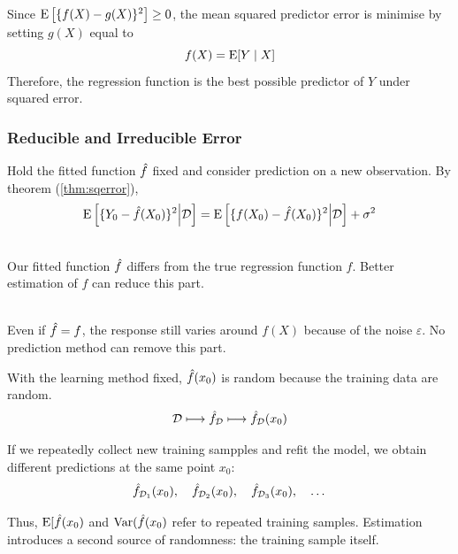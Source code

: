 Since $\operatorname{E} \big[\{f(X)-g(X)\}^2\big] \geq 0$, the mean squared predictor error is minimise by setting $g(X)$ equal to
\begin{equation*}
    f(X)=\operatorname{E}[Y \mid X]
\end{equation*}
Therefore, the regression function is the best possible predictor of $Y$ under squared error.

\subsubsection{Reducible and Irreducible Error}
Hold the fitted function $\hat{f}$ fixed and consider prediction on a new observation. By theorem (\ref{thm:sqerror}),
\begin{equation*}
    \operatorname{E} \Big[\{Y_0-\hat{f}(X_0)\}^2 \Big| \mathcal{D}\Big]
    =
    \operatorname{E} \Big[\{f(X_0)-\hat{f}(X_0)\}^2 \Big| \mathcal{D}\Big] + \sigma^2
\end{equation*}

\begin{definition}\leavevmode\\
    Our fitted function $\hat{f}$ differs from the true regression function $f$. Better estimation of $f$ can reduce this part.
\end{definition}

\begin{definition}\leavevmode\\
    Even if $\hat{f} = f$, the response still varies around $f(X)$ because of the noise $\varepsilon$. No prediction method can remove this part.
\end{definition}

With the learning method fixed, $\hat{f}(x_0)$ is random because the training data are random. 
\begin{equation*}
    \mathcal{D} \longmapsto \hat{f}_{\mathcal{D}} \longmapsto \hat{f}_{\mathcal{D}}(x_0)
\end{equation*}

If we repeatedly collect new training sampples and refit the model, we obtain different predictions at the same point $x_0$:
\begin{equation*}
    \hat{f}_{\mathcal{D}_{1}}(x_0), \quad \hat{f}_{\mathcal{D}_{2}}(x_0), \quad \hat{f}_{\mathcal{D}_{3}}(x_0), \quad \dots
\end{equation*}

Thus, $\operatorname{E}[\hat{f}(x_0)$ and $\operatorname{Var}(\hat{f}(x_0)$ refer to repeated training samples. Estimation introduces a second source of randomness: the training sample itself.

